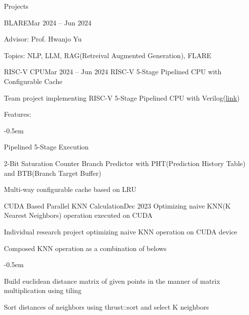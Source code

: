 \documentclass{resume}
\begin{document}
\begin{rSection}{Projects}
\begin{rSubsection}{BLARE}{Mar 2024 -- Jun 2024}
        \item Advisor: Prof. Hwanjo Yu

        \item Topics: NLP, LLM, RAG(Retreival Augmented Generation), FLARE
    \end{rSubsection}

    \begin{rSubsection}{RISC-V CPU}{Mar 2024 -- Jun 2024}
        RISC-V 5-Stage Pipelined CPU with Configurable Cache

        \item Team project implementing RISC-V 5-Stage Pipelined CPU with Verilog(\href{https://github.com/minsusun/csed311/tree/main/lab5}{link})

        \item Features:
        \vspace{-0.5em}
        \begin{list}{--}{\setlength{\rightmargin}{1.5em}}
            \itemsep -0.5em

            \item Pipelined 5-Stage Execution

            \item 2-Bit Saturation Counter Branch Predictor with PHT(Prediction History Table) and BTB(Branch Target Buffer)

            \item Multi-way configurable cache based on LRU
        \end{list}
    \end{rSubsection}

    \begin{rSubsection}{CUDA Based Parallel KNN Calculation}{Dec 2023}
        Optimizing naive KNN(K Nearest Neighbors) operation executed on CUDA

        \item Individual research project optimizing naive KNN operation on CUDA device

        \item Composed KNN operation as a combination of belows
        \vspace{-0.5em}
        \begin{list}{--}{\setlength{\rightmargin}{1.5em}}
            \itemsep -0.5em

            \item Build euclidean distance matrix of given points in the manner of matrix multiplication using tiling

            \item Sort distances of neighbors using thrust::sort and select K neighbors
        \end{list}


\end{rSubsection}
\end{rSection}
\end{document}

